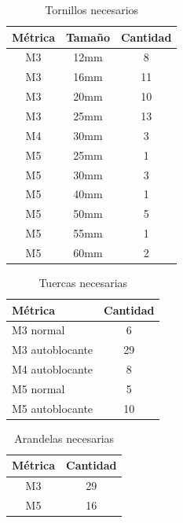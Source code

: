 \begin{table}[H]
  \begin{center}
  \begin{tabular}{|c|c|c|}
  \hline
  \textbf{Métrica} & \textbf{Tamaño} & \textbf{Cantidad} \\
  \hline
  M3 & 12mm & 8\\
  M3 & 16mm & 11\\
  M3 & 20mm & 10\\
  M3 & 25mm & 13\\
  M4 & 30mm & 3\\
  M5 & 25mm & 1\\
  M5 & 30mm & 3\\
  M5 & 40mm & 1\\
  M5 & 50mm & 5\\
  M5 & 55mm & 1\\
  M5 & 60mm & 2\\
  
  \hline
  \end{tabular}
  \caption{Tornillos necesarios}
  \label{cuadro:tornillos}
  \end{center}
  \end{table}

\begin{table}[H]
\begin{center}
\begin{tabular}{|l|c|}
\hline
\textbf{Métrica} & \textbf{Cantidad} \\
\hline
M3 normal & 6\\
M3 autoblocante & 29\\
M4 autoblocante & 8\\
M5 normal & 5\\
M5 autoblocante & 10\\

\hline
\end{tabular}
\caption{Tuercas necesarias}
\label{cuadro:tuercas}
\end{center}
\end{table}

\begin{table}[H]
  \begin{center}
  \begin{tabular}{|c|c|}
  \hline
  \textbf{Métrica} & \textbf{Cantidad} \\
  \hline
  M3 & 29\\
  M5 & 16\\
  \hline
  \end{tabular}
  \caption{Arandelas necesarias}
  \label{cuadro:arandelas}
  \end{center}
  \end{table}
  
